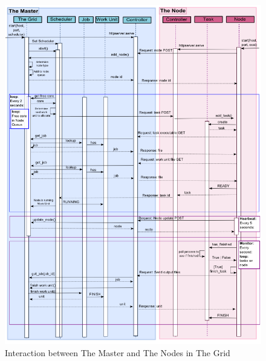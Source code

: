 \begin{figure}[htbp]
\centering
\includegraphics[keepaspectratio,width=\textwidth,height=0.75\textheight]{./figs/servernode.png}
\caption{Interaction between The Master and The Nodes in The Grid}
\end{figure}

